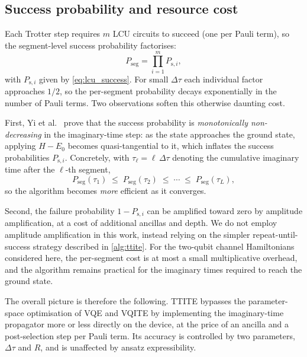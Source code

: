 \subsection{Success probability and resource cost}
\label{ssec:ttite_resources}

Each Trotter step requires $m$ LCU circuits to succeed (one per Pauli
term), so the segment-level success probability factorises:
\begin{equation}
  \label{eq:segment_success}
  P_{\mathrm{seg}} = \prod_{i=1}^{m} P_{\mathrm{s},i},
\end{equation}
with $P_{\mathrm{s},i}$ given by \cref{eq:lcu_success}. For small
$\Delta\tau$ each individual factor approaches $1/2$, so the per-segment
probability decays exponentially in the number of Pauli terms. Two
observations soften this otherwise daunting cost.

First, Yi et al.~\cite{yi2025} prove that the success probability is
\emph{monotonically non-decreasing} in the imaginary-time step: as the
state approaches the ground state, applying $H - E_0$ becomes
quasi-tangential to it, which inflates the success probabilities
$P_{\mathrm{s},i}$. Concretely, with $\tau_\ell = \ell\,\Delta\tau$
denoting the cumulative imaginary time after the $\ell$-th segment,
\begin{equation}
  \label{eq:monotone_success}
  P_{\mathrm{seg}}(\tau_1) \;\leq\;
  P_{\mathrm{seg}}(\tau_2) \;\leq\;
  \cdots \;\leq\;
  P_{\mathrm{seg}}(\tau_L),
\end{equation}
so the algorithm becomes \emph{more} efficient as it converges.

Second, the failure probability $1 - P_{\mathrm{s},i}$ can be amplified
toward zero by amplitude amplification, at a cost of additional ancillas
and depth. We do not employ amplitude amplification in this work,
instead relying on the simpler repeat-until-success strategy described
in \cref{alg:ttite}. For the two-qubit channel Hamiltonians considered
here, the per-segment cost is at most a small multiplicative overhead,
and the algorithm remains practical for the imaginary times required to
reach the ground state.

The overall picture is therefore the following. TTITE bypasses the
parameter-space optimisation of VQE and VQITE by implementing the
imaginary-time propagator more or less directly on the device, at the
price of an ancilla and a post-selection step per Pauli term. Its
accuracy is controlled by two parameters, $\Delta\tau$ and $R$, and is
unaffected by ansatz expressibility.


